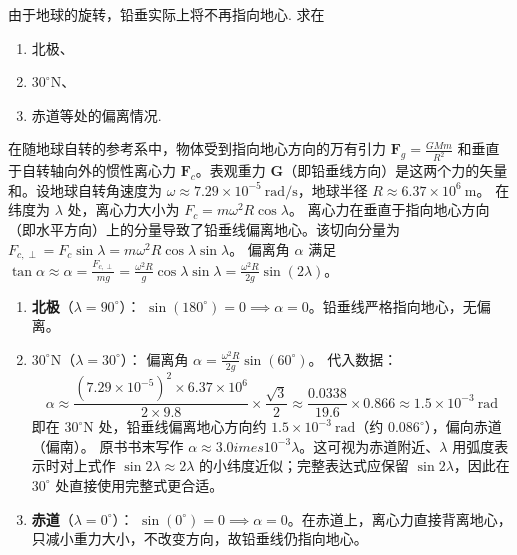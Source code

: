 \begin{exercise}\label{ex:3.7}
由于地球的旋转，铅垂实际上将不再指向地心. 求在
\begin{enumerate}
  \item[(a)] 北极、
  \item[(b)] $30^\circ\mathrm{N}$、
  \item[(c)] 赤道等处的偏离情况.
\end{enumerate}
\end{exercise}
\begin{solution}
在随地球自转的参考系中，物体受到指向地心方向的万有引力 $\boldsymbol{F}_g = \frac{GMm}{R^2}$ 和垂直于自转轴向外的惯性离心力 $\boldsymbol{F}_c$。表观重力 $\boldsymbol{G}$（即铅垂线方向）是这两个力的矢量和。设地球自转角速度为 $\omega \approx 7.29 \times 10^{-5} \ \mathrm{rad/s}$，地球半径 $R \approx 6.37 \times 10^6 \ \mathrm{m}$。
在纬度为 $\lambda$ 处，离心力大小为 $F_c = m \omega^2 R \cos\lambda$。
离心力在垂直于指向地心方向（即水平方向）上的分量导致了铅垂线偏离地心。该切向分量为 $F_{c,\perp} = F_c \sin\lambda = m \omega^2 R \cos\lambda \sin\lambda$。
偏离角 $\alpha$ 满足 $\tan\alpha \approx \alpha = \frac{F_{c,\perp}}{mg} = \frac{\omega^2 R}{g} \cos\lambda \sin\lambda = \frac{\omega^2 R}{2g} \sin(2\lambda)$。

\begin{enumerate}
    \item[(a)] \textbf{北极}（$\lambda = 90^\circ$）：
    $\sin(180^\circ) = 0 \implies \alpha = 0$。铅垂线严格指向地心，无偏离。

    \item[(b)] \textbf{$30^\circ\mathrm{N}$}（$\lambda = 30^\circ$）：
    偏离角 $\alpha = \frac{\omega^2 R}{2g} \sin(60^\circ)$。
    代入数据：
    $$ \alpha \approx \frac{(7.29 \times 10^{-5})^2 \times 6.37 \times 10^6}{2 \times 9.8} \times \frac{\sqrt{3}}{2} \approx \frac{0.0338}{19.6} \times 0.866 \approx 1.5 \times 10^{-3} \ \mathrm{rad} $$
    即在 $30^\circ\mathrm{N}$ 处，铅垂线偏离地心方向约 $1.5 \times 10^{-3} \ \mathrm{rad}$（约 $0.086^\circ$），偏向赤道（偏南）。
    原书书末写作 $\alpha\approx3.0	imes10^{-3}\lambda$。这可视为赤道附近、$\lambda$ 用弧度表示时对上式作 $\sin2\lambda\approx2\lambda$ 的小纬度近似；完整表达式应保留 $\sin2\lambda$，因此在 $30^\circ$ 处直接使用完整式更合适。

    \item[(c)] \textbf{赤道}（$\lambda = 0^\circ$）：
    $\sin(0^\circ) = 0 \implies \alpha = 0$。在赤道上，离心力直接背离地心，只减小重力大小，不改变方向，故铅垂线仍指向地心。
\end{enumerate}
\end{solution}

